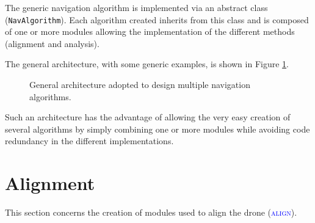 The generic navigation algorithm is implemented via an abstract class (\texttt{NavAlgorithm}). Each algorithm created inherits from this class and is composed of one or more modules allowing the implementation of the different methods (alignment and analysis).

The general architecture, with some generic examples, is shown in Figure \ref{fig:06.navigation.algorithms.architecture}.

\begin{figure}[H]
    \centering
    \caption{General architecture adopted to design multiple navigation algorithms.}
    \label{fig:06.navigation.algorithms.architecture}
\end{figure}

Such an architecture has the advantage of allowing the very easy creation of several algorithms by simply combining one or more modules while avoiding code redundancy in the different implementations.

\section{Alignment}

This section concerns the creation of modules used to align the drone (\textsc{\textcolor{blue}{align}}).

